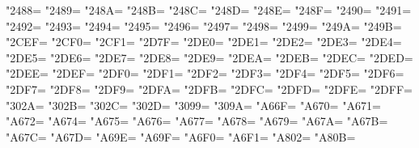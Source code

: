 \XeTeXcharclass"2488=\KclassNum
\XeTeXcharclass"2489=\KclassNum
\XeTeXcharclass"248A=\KclassNum
\XeTeXcharclass"248B=\KclassNum
\XeTeXcharclass"248C=\KclassNum
\XeTeXcharclass"248D=\KclassNum
\XeTeXcharclass"248E=\KclassNum
\XeTeXcharclass"248F=\KclassNum
\XeTeXcharclass"2490=\KclassNum
\XeTeXcharclass"2491=\KclassNum
\XeTeXcharclass"2492=\KclassNum
\XeTeXcharclass"2493=\KclassNum
\XeTeXcharclass"2494=\KclassNum
\XeTeXcharclass"2495=\KclassNum
\XeTeXcharclass"2496=\KclassNum
\XeTeXcharclass"2497=\KclassNum
\XeTeXcharclass"2498=\KclassNum
\XeTeXcharclass"2499=\KclassNum
\XeTeXcharclass"249A=\KclassNum
\XeTeXcharclass"249B=\KclassNum
\XeTeXcharclass"2CEF=\KclassNum
\XeTeXcharclass"2CF0=\KclassNum
\XeTeXcharclass"2CF1=\KclassNum
\XeTeXcharclass"2D7F=\KclassNum
\XeTeXcharclass"2DE0=\KclassNum
\XeTeXcharclass"2DE1=\KclassNum
\XeTeXcharclass"2DE2=\KclassNum
\XeTeXcharclass"2DE3=\KclassNum
\XeTeXcharclass"2DE4=\KclassNum
\XeTeXcharclass"2DE5=\KclassNum
\XeTeXcharclass"2DE6=\KclassNum
\XeTeXcharclass"2DE7=\KclassNum
\XeTeXcharclass"2DE8=\KclassNum
\XeTeXcharclass"2DE9=\KclassNum
\XeTeXcharclass"2DEA=\KclassNum
\XeTeXcharclass"2DEB=\KclassNum
\XeTeXcharclass"2DEC=\KclassNum
\XeTeXcharclass"2DED=\KclassNum
\XeTeXcharclass"2DEE=\KclassNum
\XeTeXcharclass"2DEF=\KclassNum
\XeTeXcharclass"2DF0=\KclassNum
\XeTeXcharclass"2DF1=\KclassNum
\XeTeXcharclass"2DF2=\KclassNum
\XeTeXcharclass"2DF3=\KclassNum
\XeTeXcharclass"2DF4=\KclassNum
\XeTeXcharclass"2DF5=\KclassNum
\XeTeXcharclass"2DF6=\KclassNum
\XeTeXcharclass"2DF7=\KclassNum
\XeTeXcharclass"2DF8=\KclassNum
\XeTeXcharclass"2DF9=\KclassNum
\XeTeXcharclass"2DFA=\KclassNum
\XeTeXcharclass"2DFB=\KclassNum
\XeTeXcharclass"2DFC=\KclassNum
\XeTeXcharclass"2DFD=\KclassNum
\XeTeXcharclass"2DFE=\KclassNum
\XeTeXcharclass"2DFF=\KclassNum
\XeTeXcharclass"302A=\KclassNum
\XeTeXcharclass"302B=\KclassNum
\XeTeXcharclass"302C=\KclassNum
\XeTeXcharclass"302D=\KclassNum
\XeTeXcharclass"3099=\KclassNum
\XeTeXcharclass"309A=\KclassNum
\XeTeXcharclass"A66F=\KclassNum
\XeTeXcharclass"A670=\KclassNum
\XeTeXcharclass"A671=\KclassNum
\XeTeXcharclass"A672=\KclassNum
\XeTeXcharclass"A674=\KclassNum
\XeTeXcharclass"A675=\KclassNum
\XeTeXcharclass"A676=\KclassNum
\XeTeXcharclass"A677=\KclassNum
\XeTeXcharclass"A678=\KclassNum
\XeTeXcharclass"A679=\KclassNum
\XeTeXcharclass"A67A=\KclassNum
\XeTeXcharclass"A67B=\KclassNum
\XeTeXcharclass"A67C=\KclassNum
\XeTeXcharclass"A67D=\KclassNum
\XeTeXcharclass"A69E=\KclassNum
\XeTeXcharclass"A69F=\KclassNum
\XeTeXcharclass"A6F0=\KclassNum
\XeTeXcharclass"A6F1=\KclassNum
\XeTeXcharclass"A802=\KclassNum
\XeTeXcharclass"A80B=\KclassNum
